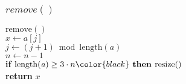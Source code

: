 \documentclass{beamer}
\begin{document}
\begin{frame}
\frametitle{$remove()$}
\begin{oframed}
\begin{flushleft}
\hspace*{1em} $\ensuremath{\mathrm{remove}()}$\\

\hspace*{1em} \hspace*{1em} $\ensuremath{\ensuremath{\mathit{x}} \gets  \ensuremath{\ensuremath{\mathit{a}}[\ensuremath{\mathit{j}}]}}$\\
\hspace*{1em} \hspace*{1em} $\ensuremath{\ensuremath{\mathit{j}} \gets  \ensuremath{(\ensuremath{\mathit{j}} + 1) \bmod  \mathrm{length}(\ensuremath{\mathit{a}})}}$\\
\hspace*{1em} \hspace*{1em} $\ensuremath{\ensuremath{\mathit{n}} \gets  \ensuremath{\ensuremath{\mathit{n}} - 1}}$\\
\hspace*{1em} \hspace*{1em} {\color{black} \textbf{if}} $\ensuremath{\mathrm{length}(\ensuremath{\mathit{a}}) \ge 3\cdot n} {\color{black} \textbf{ then }}  \ensuremath{\mathrm{resize}()}$\\
\hspace*{1em} \hspace*{1em} {\color{black} \textbf{return}} $\ensuremath{\ensuremath{\mathit{x}}}$\\
\end{flushleft}
\end{oframed}
\end{frame}
\end{document}
